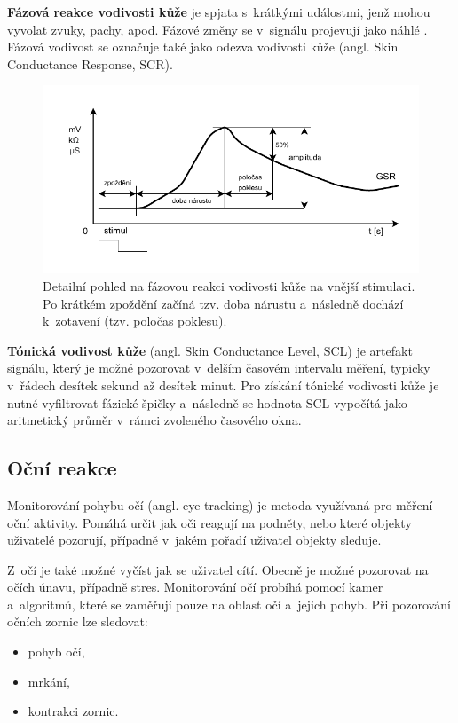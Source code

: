         \textbf{Fázová reakce vodivosti kůže} je spjata s~krátkými událostmi, jenž mohou vyvolat zvuky, pachy, apod. Fázové změny se v~signálu projevují jako náhlé . Fázová vodivost se označuje také jako odezva vodivosti kůže (angl. Skin Conductance Response, SCR).
        
        \begin{figure}[H]
            \centering
            \includegraphics[width=\textwidth]{obrazky-figures/gsr_scr.pdf}
            \caption{Detailní pohled na fázovou reakci vodivosti kůže na vnější stimulaci. Po krátkém zpoždění začíná tzv. doba nárustu a~následně dochází k~zotavení (tzv. poločas poklesu).}
            \label{fig:scr_graph}
        \end{figure}
        
        \textbf{Tónická vodivost kůže} (angl. Skin Conductance Level, SCL) je artefakt signálu, který je možné pozorovat v~delším časovém intervalu měření, typicky v~řádech desítek sekund až desítek minut. Pro získání tónické vodivosti kůže je nutné vyfiltrovat fázické špičky a~následně se hodnota SCL vypočítá jako aritmetický průměr v~rámci zvoleného časového okna. 
        
        
       
        \subsection{Oční reakce}
        \label{eye_tracking}
        Monitorování pohybu očí (angl. eye tracking) je metoda využívaná pro měření oční aktivity. Pomáhá určit jak oči reagují na podněty, nebo které objekty uživatelé pozorují, případně v~jakém pořadí uživatel objekty sleduje.
        
        Z~očí je také možné vyčíst jak se uživatel cítí. Obecně je možné pozorovat na očích únavu, případně stres. Monitorování očí probíhá pomocí kamer a~algoritmů, které se zaměřují pouze na oblast očí a~jejich pohyb. Při pozorování očních zornic lze sledovat:
        \begin{itemize}
            \item pohyb očí,
            \item mrkání,
            \item kontrakci zornic.
        \end{itemize}
        
